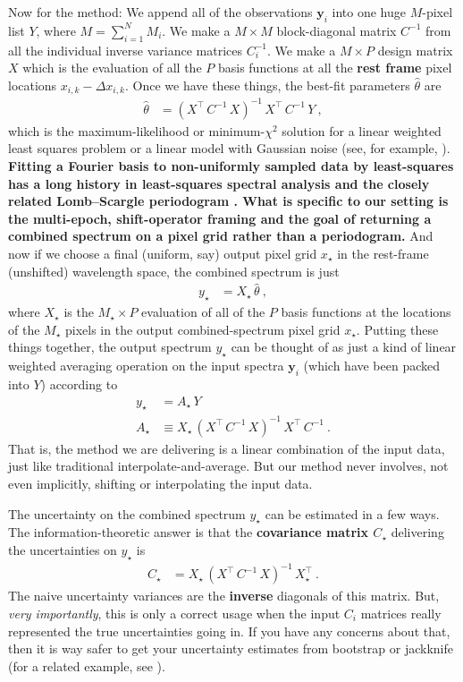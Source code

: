 \documentclass[modern, linenumbers]{aastex631}
\newcommand{\modified}[1]{\textcolor{Emerald}{\textbf{#1}}}
\begin{document}
Now for the method:
We append all of the observations \modified{$\mathbf{y}_i$} into one huge $M$-pixel list $Y$, where $M=\sum_{i=1}^N M_i$.
We make a $M\times M$ block-diagonal matrix $C^{-1}$ from all the individual inverse variance matrices $C_i^{-1}$.
We make a $M\times P$ design matrix $X$ which is the evaluation of all the $P$ basis functions at all the \modified{rest frame} pixel locations \modified{$x_{i,k} - \Delta x_{i,k}$}.
Once we have these things, the best-fit parameters $\hat\theta$ are
\begin{align}
    \hat\theta &= (X^\top\,C^{-1}\,X)^{-1}\,X^\top\,C^{-1}\,Y ~, \label{eq:xtxinvxty}
\end{align}
which is the maximum-likelihood or minimum-$\chi^2$ solution for a linear weighted least squares problem or a linear model with Gaussian noise (see, for example, \citealt{fitting}).
\modified{
    Fitting a Fourier basis to non-uniformly sampled data by least-squares has a long history in least-squares spectral analysis \citep{vanicek1971, craymer1998} and the closely related Lomb--Scargle periodogram \citep{lomb1976, scargle1982}. What is specific to our setting is the multi-epoch, shift-operator framing and the goal of returning a combined spectrum on a pixel grid rather than a periodogram.
}
And now if we choose a final (uniform, say) output pixel grid $x_\star$ in the rest-frame (unshifted) wavelength space, the combined spectrum is just
\begin{align}
    y_\star &= X_\star\,\hat\theta ~,
\end{align}
where $X_\star$ is the $M_\star\times P$ evaluation of all of the $P$ basis functions at the locations of the $M_\star$ pixels in the output combined-spectrum pixel grid $x_\star$.
Putting these things together, the output spectrum $y_\star$ can be thought of as just a kind of linear weighted averaging operation on the input spectra \modified{$\mathbf{y}_i$} (which have been packed into $Y$) according to
\begin{align}
    y_\star &= A_\star\,Y \\
    A_\star &\equiv X_\star\,(X^\top\,C^{-1}\,X)^{-1}\,X^\top\,C^{-1} ~.
\end{align}
That is, the method we are delivering is a linear combination of the input data, just like traditional interpolate-and-average.
But our method never involves, not even implicitly, shifting or interpolating the input data.

The uncertainty on the combined spectrum $y_\star$ can be estimated in a few ways.
The information-theoretic answer is that the \modified{covariance matrix $C_\star$} delivering the uncertainties on $y_\star$ is
\modified{
\begin{align}
    C_\star &= X_\star\,(X^\top\,C^{-1}\,X)^{-1}\,X_\star^\top ~.\label{eq:outcovar}
\end{align}
}The naive uncertainty variances are the \modified{inverse} diagonals of this matrix.
But, \emph{very importantly}, this is only a correct usage when the input $C_i$ matrices really represented the true uncertainties going in.
If you have any concerns about that, then it is way safer to get your uncertainty estimates from bootstrap or jackknife (for a related example, see \citealt{fittingflexible}).
\end{document}
